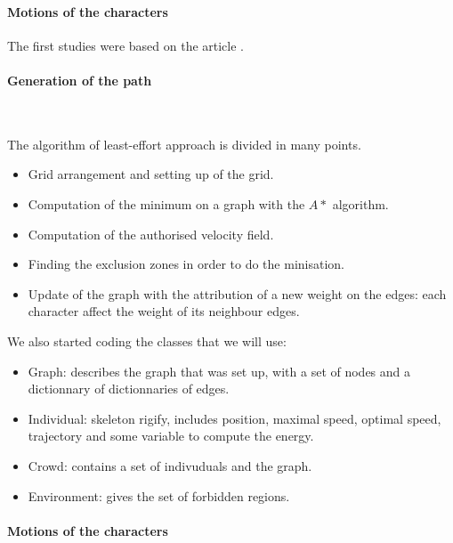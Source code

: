\paragraph{Motions of the characters}

The first studies were based on the article .%


\paragraph{Generation of the path}~

\noindent The algorithm of least-effort approach is divided in many points.
\begin{itemize}
  \item Grid arrangement and setting up of the grid.
  \item Computation of the minimum on a graph with the $A*$ algorithm.
  \item Computation of the authorised velocity field.
  \item Finding the exclusion zones in order to do the minisation.
  \item Update of the graph with the attribution of a new weight on the edges: each character affect the weight of its neighbour edges.
\end{itemize}

\noindent We also started coding the classes that we will use:
\begin{itemize}
  \item Graph: describes the graph that was set up, with a set of nodes and a dictionnary of dictionnaries of edges.
  \item Individual: skeleton rigify, includes position, maximal speed, optimal speed, trajectory and some variable to compute the energy.
  \item Crowd: contains a set of indivuduals and the graph.
  \item Environment: gives the set of forbidden regions.
\end{itemize}

\paragraph{Motions of the characters}~
